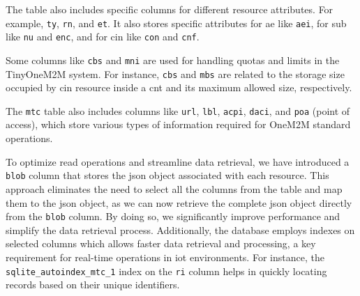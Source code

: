 \documentclass[a4paper,fleqn]{cas-dc}
\begin{document}
The table also includes specific columns for different resource attributes. For example, \texttt{ty}, \texttt{rn}, and \texttt{et}. It also stores specific attributes for \gls{ae} like \texttt{aei}, for \gls{sub} like \texttt{nu} and \texttt{enc}, and for \gls{cin} like \texttt{con} and \texttt{cnf}.

Some columns like \texttt{cbs} and \texttt{mni} are used for handling quotas and limits in the TinyOneM2M system. For instance, \texttt{cbs} and \texttt{mbs} are related to the storage size occupied by \gls{cin} resource inside a \gls{cnt} and its maximum allowed size, respectively.

The \texttt{mtc} table also includes columns like \texttt{url}, \texttt{lbl}, \texttt{acpi}, \texttt{daci}, and \texttt{poa} (point of access), which store various types of information required for OneM2M standard operations.

To optimize read operations and streamline data retrieval, we have introduced a \texttt{blob} column that stores the \gls{json} object associated with each resource. This approach eliminates the need to select all the columns from the table and map them to the \gls{json} object, as we can now retrieve the complete \gls{json} object directly from the \texttt{blob} column. By doing so, we significantly improve performance and simplify the data retrieval process. Additionally, the database employs indexes on selected columns which allows faster data retrieval and processing, a key requirement for real-time operations in \gls{iot} environments. For instance, the \texttt{sqlite\_autoindex\_mtc\_1} index on the \texttt{ri} column helps in quickly locating records based on their unique identifiers.
\end{document}
